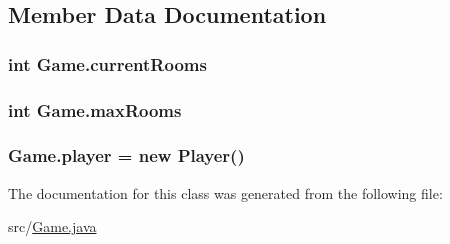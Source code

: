 \subsection{Member Data Documentation}
\hypertarget{class_game_a6c971d217035a9afd591a2fef942593d}{}
\subsubsection[{current\+Rooms}]{\setlength{\rightskip}{0pt plus 5cm}int Game.\+current\+Rooms}\label{class_game_a6c971d217035a9afd591a2fef942593d}
\hypertarget{class_game_a35d7485500ee1c2ec4ec93201aebddbb}{}
\subsubsection[{max\+Rooms}]{\setlength{\rightskip}{0pt plus 5cm}int Game.\+max\+Rooms}\label{class_game_a35d7485500ee1c2ec4ec93201aebddbb}
\hypertarget{class_game_abca4659998fe751258381792e922f138}{}
\subsubsection[{player}]{ Game.\+player = new {\bf Player}()}\label{class_game_abca4659998fe751258381792e922f138}


The documentation for this class was generated from the following file\+:\begin{DoxyCompactItemize}
\item 
src/\hyperlink{_game_8java}{Game.\+java}\end{DoxyCompactItemize}

